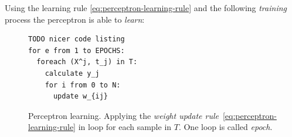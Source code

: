 Using the learning rule \ref{eq:perceptron-learning-rule} and the following \emph{training} process the perceptron is able to \emph{learn}: 
\begin{figure}[H]
  \centering
\begin{lstlisting}
TODO nicer code listing 
for e from 1 to EPOCHS: 
  foreach (X^j, t_j) in T: 
    calculate y_j
    for i from 0 to N: 
      update w_{ij}
\end{lstlisting}
  \caption{Perceptron learning. Applying the \emph{weight update rule}~\ref{eq:perceptron-learning-rule} in loop for each sample in $T$. One loop is called \emph{epoch}.}  
  \label{fig:perceptron-learning}
\end{figure}

